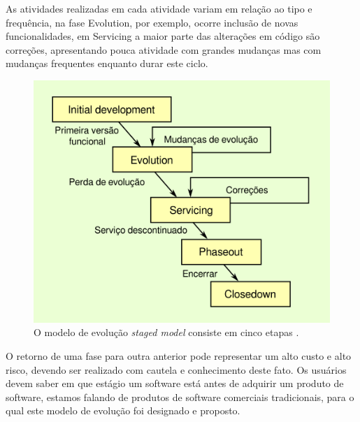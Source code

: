 As atividades realizadas em cada atividade variam em relação ao tipo e
frequência, na fase Evolution, por exemplo, ocorre inclusão de novas
funcionalidades, em Servicing a maior parte das alterações em código são
correções, apresentando pouca atividade com grandes mudanças mas com mudanças
frequentes enquanto durar este ciclo.

\begin{figure}[h]
  \center
  \includegraphics[scale=0.6]{imagens/staged-model-cycle.png}
  \caption{O modelo de evolução {\it staged model} consiste em cinco etapas \cite{rajlich2000staged}.}
  \label{staged-model-cycle}
\end{figure}

O retorno de uma fase para outra anterior pode representar um alto custo e alto
risco, devendo ser realizado com cautela e conhecimento deste fato.  Os
usuários devem saber em que estágio um software está antes de adquirir um
produto de software, estamos falando de produtos de software comerciais
tradicionais, para o qual este modelo de evolução foi designado e proposto.


